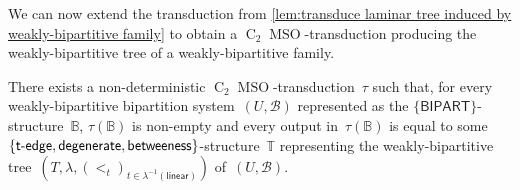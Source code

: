 \documentclass{lmcs} %
\newcommand{\MSO}{\ensuremath{\operatorname{MSO}}\xspace}
\newcommand{\CMSO}[1][]{\ensuremath{\C[#1]{\!\!}\MSO}\xspace}
\newcommand{\C}[1][]{\ensuremath{\operatorname{C}_{#1}}\xspace}
\newcommand{\betweeness}{\mathsf{betweeness}}
\newcommand{\tedge}{\ensuremath{\mathsf{t}\text-\mathsf{edge}}\xspace}
\newcommand{\BIPARTITION}{\ensuremath{\mathsf{BIPART}}\xspace}
\newcommand\DEGENERATE{\ensuremath{\mathsf{degenerate}}\xspace}
\newcommand\LINEAR{\ensuremath{\mathsf{linear}}\xspace}
\begin{document}
We can now extend the transduction from \autoref{lem:transduce laminar tree induced by weakly-bipartitive family} to obtain a \CMSO[2]-transduction producing the weakly-bipartitive tree of a weakly-bipartitive family.
\begin{thm}
    \label{thm:transduce weakly-bipartitive tree}
    There exists a non-deterministic \CMSO[2]-transduction~$\tau$
    such that,
    for every weakly-bipartitive bipartition system~$(U,\mathcal{B})$
    represented as the $\{\BIPARTITION\}$-structure~$\mathbb{B}$,
    $\tau(\mathbb{B})$ is non-empty and every output in~$\tau(\mathbb{B})$
    is equal to some $\{\tedge,\DEGENERATE,\betweeness\}$-structure~$\mathbb{T}$
    representing the weakly-bipartitive tree~$\left(T,\lambda,(<_t)_{t\in \lambda^{-1}(\LINEAR)}\right)$ of~$(U,\mathcal{B})$.
\end{thm}
\end{document}
